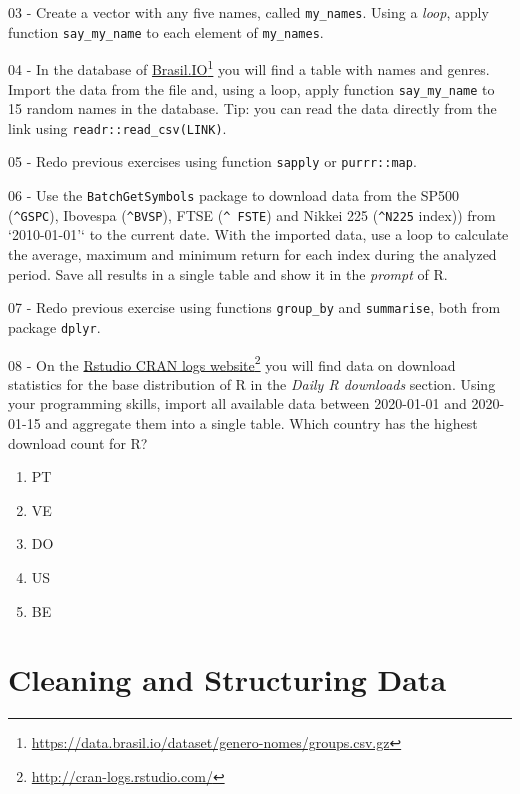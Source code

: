 \documentclass[
  12pt,
]{book}
\providecommand{\tightlist}{%
  \setlength{\itemsep}{0pt}\setlength{\parskip}{0pt}}
\begin{document}
03 -
Create a vector with any five names, called \texttt{my\_names}. Using a \emph{loop}, apply function \texttt{say\_my\_name} to each element of \texttt{my\_names}.

04 -
In the database of \href{https://data.brasil.io/dataset/genero-nomes/groups.csv.gz}{Brasil.IO}\footnote{\url{https://data.brasil.io/dataset/genero-nomes/groups.csv.gz}} you will find a table with names and genres. Import the data from the file and, using a loop, apply function \texttt{say\_my\_name} to 15 random names in the database. Tip: you can read the data directly from the link using \texttt{readr::read\_csv(LINK)}.

05 -
Redo previous exercises using function \texttt{sapply} or \texttt{purrr::map}.

06 -
Use the \texttt{BatchGetSymbols} package to download data from the SP500 (\texttt{\textquotesingle{}\^{}GSPC\textquotesingle{}}), Ibovespa (\texttt{\textquotesingle{}\^{}BVSP\textquotesingle{}}), FTSE (\texttt{\textquotesingle{}\^{}\ FSTE\textquotesingle{}}) and Nikkei 225 (\texttt{\textquotesingle{}\^{}N225\textquotesingle{}} index)) from `2010-01-01'` to the current date. With the imported data, use a loop to calculate the average, maximum and minimum return for each index during the analyzed period. Save all results in a single table and show it in the \emph{prompt} of R.

07 -
Redo previous exercise using functions \texttt{group\_by} and \texttt{summarise}, both from package \texttt{dplyr}.

08 -
On the \href{http://cran-logs.rstudio.com/}{Rstudio CRAN logs website}\footnote{\url{http://cran-logs.rstudio.com/}} you will find data on download statistics for the base distribution of R in the \emph{Daily R downloads} section. Using your programming skills, import all available data between 2020-01-01 and 2020-01-15 and aggregate them into a single table. Which country has the highest download count for R?

\begin{enumerate}
\def\labelenumi{\alph{enumi})}
\tightlist
\item
  PT
\item
  VE
\item
  DO
\item
  US
\item
  BE
\end{enumerate}

\hypertarget{cleaning}{%
\chapter{Cleaning and Structuring Data}\label{cleaning}}
\end{document}
